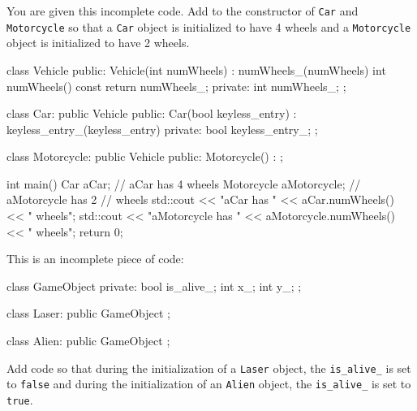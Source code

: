 \begin{ex} You are given this incomplete code. Add to the
constructor of \verb!Car! and \verb!Motorcycle! so that a \verb!Car!
object is initialized to have 4 wheels and a \verb!Motorcycle! object is
initialized to have 2 wheels.

\begin{console}
class Vehicle
{
public:
        Vehicle(int numWheels)
           : numWheels_(numWheels)
        {}
        int numWheels() const { return numWheels_; }
private:
        int numWheels_;
};

class Car: public Vehicle
{
public:
        Car(bool keyless_entry)
           : keyless_entry_(keyless_entry)
        {}
private:
        bool keyless_entry_;
};

class Motorcycle: public Vehicle
{
public:
        Motorcycle()
            :
        {}
};

int main()
{   
    Car aCar;               // aCar has 4 wheels
    Motorcycle aMotorcycle; // aMotorcycle has 2
                            // wheels
    std::cout << "aCar has "
              << aCar.numWheels() << " wheels\n";
    std::cout << "aMotorcycle has "
              << aMotorcycle.numWheels()
              << " wheels\n";
    return 0;
}
\end{console}

\end{ex}
\begin{ex}
This is an incomplete piece of code:
\begin{console}
class GameObject
{
private:
        bool is_alive_;
        int x_;
        int y_;
};

class Laser: public GameObject
{
};

class Alien: public GameObject
{
};
\end{console}
\end{ex}
Add code so that during the initialization of a \verb!Laser! object, the
\verb!is_alive_! is set to \verb!false! and during the initialization
of an \verb!Alien! object, the \verb!is_alive_! is set to \verb!true!.

